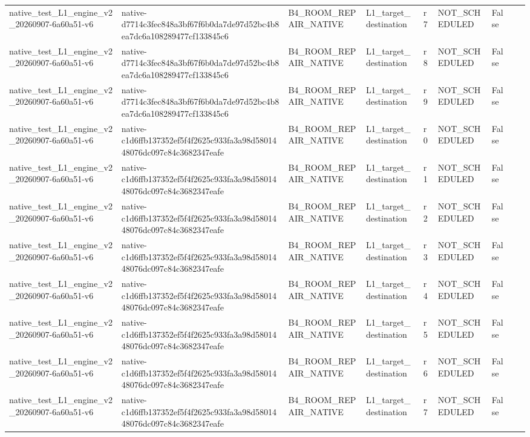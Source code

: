 \begin{tabular}{lllllllll}
native\_test\_L1\_engine\_v2\_20260907-6a60a51-v6 & native-d7714c3fec848a3bf67f6b0da7de97d52bc4b8ea7dc6a108289477cf133845c6 & B4\_ROOM\_REPAIR\_NATIVE & L1\_target\_destination & r7 & NOT\_SCHEDULED & False &  &  \\
native\_test\_L1\_engine\_v2\_20260907-6a60a51-v6 & native-d7714c3fec848a3bf67f6b0da7de97d52bc4b8ea7dc6a108289477cf133845c6 & B4\_ROOM\_REPAIR\_NATIVE & L1\_target\_destination & r8 & NOT\_SCHEDULED & False &  &  \\
native\_test\_L1\_engine\_v2\_20260907-6a60a51-v6 & native-d7714c3fec848a3bf67f6b0da7de97d52bc4b8ea7dc6a108289477cf133845c6 & B4\_ROOM\_REPAIR\_NATIVE & L1\_target\_destination & r9 & NOT\_SCHEDULED & False &  &  \\
native\_test\_L1\_engine\_v2\_20260907-6a60a51-v6 & native-c1d6ffb137352ef5f4f2625c933fa3a98d5801448076dc097c84c3682347eafe & B4\_ROOM\_REPAIR\_NATIVE & L1\_target\_destination & r0 & NOT\_SCHEDULED & False &  &  \\
native\_test\_L1\_engine\_v2\_20260907-6a60a51-v6 & native-c1d6ffb137352ef5f4f2625c933fa3a98d5801448076dc097c84c3682347eafe & B4\_ROOM\_REPAIR\_NATIVE & L1\_target\_destination & r1 & NOT\_SCHEDULED & False &  &  \\
native\_test\_L1\_engine\_v2\_20260907-6a60a51-v6 & native-c1d6ffb137352ef5f4f2625c933fa3a98d5801448076dc097c84c3682347eafe & B4\_ROOM\_REPAIR\_NATIVE & L1\_target\_destination & r2 & NOT\_SCHEDULED & False &  &  \\
native\_test\_L1\_engine\_v2\_20260907-6a60a51-v6 & native-c1d6ffb137352ef5f4f2625c933fa3a98d5801448076dc097c84c3682347eafe & B4\_ROOM\_REPAIR\_NATIVE & L1\_target\_destination & r3 & NOT\_SCHEDULED & False &  &  \\
native\_test\_L1\_engine\_v2\_20260907-6a60a51-v6 & native-c1d6ffb137352ef5f4f2625c933fa3a98d5801448076dc097c84c3682347eafe & B4\_ROOM\_REPAIR\_NATIVE & L1\_target\_destination & r4 & NOT\_SCHEDULED & False &  &  \\
native\_test\_L1\_engine\_v2\_20260907-6a60a51-v6 & native-c1d6ffb137352ef5f4f2625c933fa3a98d5801448076dc097c84c3682347eafe & B4\_ROOM\_REPAIR\_NATIVE & L1\_target\_destination & r5 & NOT\_SCHEDULED & False &  &  \\
native\_test\_L1\_engine\_v2\_20260907-6a60a51-v6 & native-c1d6ffb137352ef5f4f2625c933fa3a98d5801448076dc097c84c3682347eafe & B4\_ROOM\_REPAIR\_NATIVE & L1\_target\_destination & r6 & NOT\_SCHEDULED & False &  &  \\
native\_test\_L1\_engine\_v2\_20260907-6a60a51-v6 & native-c1d6ffb137352ef5f4f2625c933fa3a98d5801448076dc097c84c3682347eafe & B4\_ROOM\_REPAIR\_NATIVE & L1\_target\_destination & r7 & NOT\_SCHEDULED & False &  &  \\

\end{tabular}
